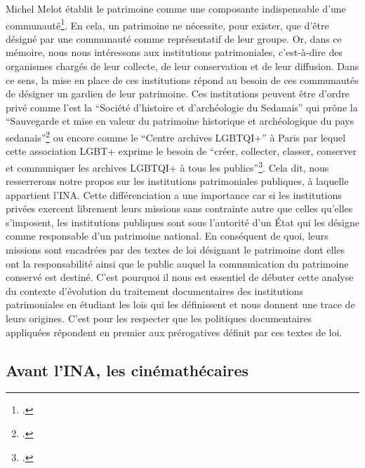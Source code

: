 
Michel Melot établit le patrimoine comme une composante indispensable d'une communauté\footcite[]{melot2004}. En cela, un patrimoine ne nécessite, pour exister, que d'être désigné par une communauté comme représentatif de leur groupe. Or, dans ce mémoire, nous nous intéressons aux institutions patrimoniales, c'est-à-dire des organismes chargés de leur collecte, de leur conservation et de leur diffusion. Dans ce sens, la mise en place de ces institutions répond au besoin de ces communautés de désigner un gardien de leur patrimoine. Ces institutions peuvent être d'ordre privé comme l'est la \enquote{Société d’histoire et d’archéologie du Sedanais} qui prône la \enquote{Sauvegarde et mise en valeur du patrimoine historique et archéologique du pays sedanais}\footcite[]{sedan} ou encore comme le \enquote{Centre archives LGBTQI+} à Paris par lequel cette association LGBT+ exprime le besoin de \enquote{créer, collecter, classer, conserver et communiquer les archives LGBTQI+ à tous les publics}\footcite{lgbt}. Cela dit, nous resserrerons notre propos sur les institutions patrimoniales publiques, à laquelle appartient l'INA. Cette différenciation a une importance car si les institutions privées exercent librement leurs missions sans contrainte autre que celles qu'elles s'imposent, les institutions publiques sont sous l'autorité d'un État qui les désigne comme responsable d'un patrimoine national. En conséquent de quoi, leurs missions sont encadrées par des textes de loi désignant le patrimoine dont elles ont la responsabilité ainsi que le public auquel la communication du patrimoine conservé est destiné. C'est pourquoi il nous est essentiel de débuter cette analyse du contexte d'évolution du traitement documentaires des institutions patrimoniales en étudiant les lois qui les définissent et nous donnent une trace de leurs origines. C'est pour les respecter que les politiques documentaires appliquées répondent en premier aux prérogatives définit par ces textes de loi. 

\subsection{Avant l'INA, les cinémathécaires}


